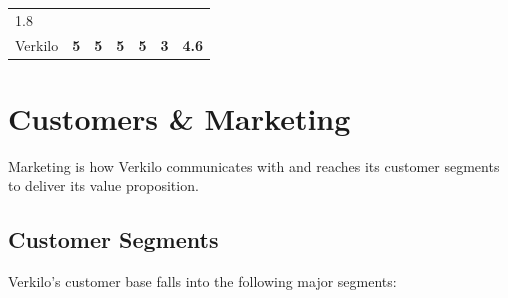 \documentclass[11pt,openany]{book}
\begin{document}
\begin{longtable}[]{@{}lcccccc@{}}
\begin{minipage}[t]{0.10\columnwidth}
1.8\strut
\end{minipage}\tabularnewline
\begin{minipage}[t]{0.29\columnwidth}\raggedright
Verkilo\strut
\end{minipage} & \begin{minipage}[t]{0.09\columnwidth}\centering
\textbf{5}\strut
\end{minipage} & \begin{minipage}[t]{0.08\columnwidth}\centering
\textbf{5}\strut
\end{minipage} & \begin{minipage}[t]{0.09\columnwidth}\centering
\textbf{5}\strut
\end{minipage} & \begin{minipage}[t]{0.07\columnwidth}\centering
\textbf{5}\strut
\end{minipage} & \begin{minipage}[t]{0.10\columnwidth}\centering
\textbf{3}\strut
\end{minipage} & \begin{minipage}[t]{0.10\columnwidth}\centering
\textbf{4.6}\strut
\end{minipage}\tabularnewline
\bottomrule
\end{longtable}

\hypertarget{customers-marketing}{%
\chapter{Customers \& Marketing}\label{customers-marketing}}

Marketing is how Verkilo communicates with and reaches its customer
segments to deliver its value proposition.

\hypertarget{customer-segments}{%
\section{Customer Segments}\label{customer-segments}}

Verkilo's customer base falls into the following major segments:
\end{document}
